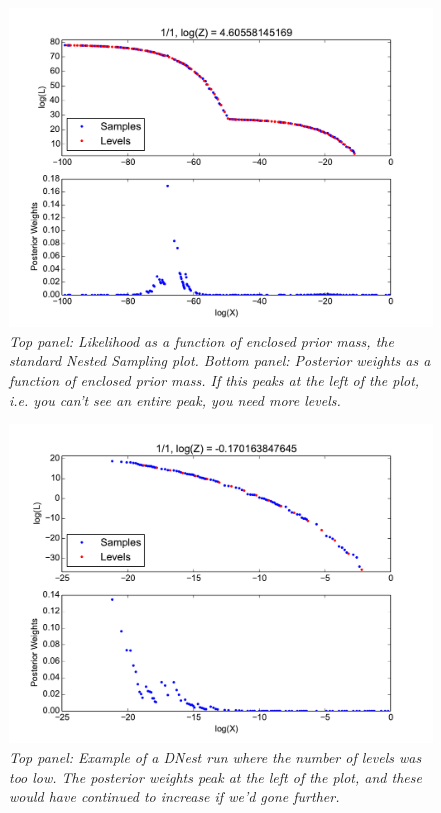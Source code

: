 \documentclass[a4paper, 11pt]{article}
\begin{document}
\begin{figure}
\begin{center}
\includegraphics[scale=0.5]{fig3.pdf}
\caption{\it Top panel: Likelihood as a function of enclosed prior mass,
the standard Nested Sampling plot. Bottom panel: Posterior weights as a
function of enclosed prior mass. If this peaks at the left of the plot,
i.e. you can't see an entire peak, you need more levels.\label{fig:fig3}}
\end{center}
\end{figure}


\begin{figure}
\begin{center}
\includegraphics[scale=0.5]{not_enough_levels.pdf}
\caption{\it Top panel: Example of a DNest run where the number of levels
was too low. The posterior weights peak at the left of the plot, and these
would have continued to increase if we'd gone further.
\label{fig:not_enough_levels}}
\end{center}
\end{figure}
\end{document}
